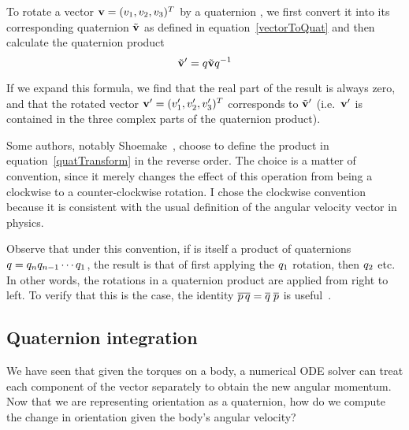 To rotate a vector $\ve{v} = (v_1, v_2, v_3)^T$ by a quaternion , we first
convert it into its corresponding quaternion $\tilde{\ve{v}}$ as defined in
equation~\ref{vectorToQuat} and then calculate the quaternion product
\begin{equation}
\label{quatTransform}
\tilde{\ve{v}}' = \q{q}\tilde{\ve{v}}\q{q}^{-1}
\end{equation}

If we expand this formula, we find that the real part of the result is always zero, and
that the rotated vector $\ve{v}' = (v_1', v_2', v_3')^T$ corresponds
to $\tilde{\ve{v}}'$ (i.e.\ $\ve{v}'$ is contained in the three complex parts of
the quaternion product).

Some authors, notably Shoemake~\cite{Shoemake:85}, choose to define the product in
equation~\ref{quatTransform} in
the reverse order. The choice is a matter of convention, since it merely changes the effect
of this operation from being a clockwise to a counter-clockwise rotation. I chose the clockwise
convention because it is consistent with the usual definition of the angular velocity vector
in physics.

Observe that under this convention, if  is itself a product of quaternions
$q = q_n q_{n-1} \cdots q_1$, the result is that of first applying the
$q_1$ rotation, then $q_2$ etc. In other words, the rotations in a quaternion product
are applied from right to left. To verify that this is the case, the identity
$\overline{p\, q} = \overline{q}\; \overline{p}$
is useful~\cite{MathWorld:Quaternion}.

\subsection{Quaternion integration}

We have seen that given the torques on a body, a numerical ODE solver can treat each component
of the vector separately to obtain the new angular momentum. Now that we are representing
orientation as a quaternion, how do we compute the change in orientation given the body's angular
velocity?


